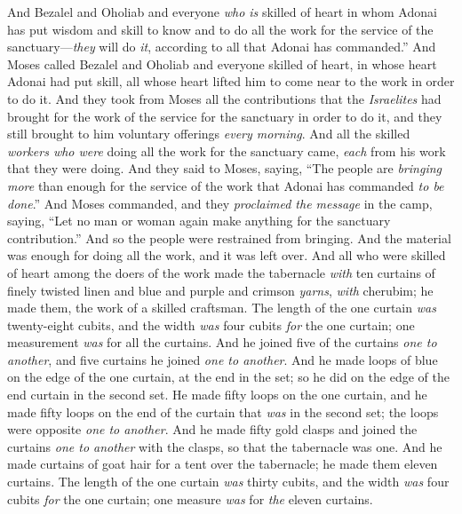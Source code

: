 \begin{biblechapter} %
\verse And Bezalel and Oholiab and everyone \textit{who is} skilled of heart in whom Adonai has put wisdom and skill to know and to do all the work for the service of the sanctuary—\textit{they} will do \textit{it}, according to all that Adonai has commanded.”
 And Moses called Bezalel and Oholiab and everyone skilled of heart, in whose heart Adonai had put skill, all whose heart lifted him to come near to the work in order to do it.
\verse And they took from Moses all the contributions that the \textit{Israelites} had brought for the work of the service for the sanctuary in order to do it, and they still brought to him voluntary offerings \textit{every morning}.
\verse And all the skilled \textit{workers who were} doing all the work for the sanctuary came, \textit{each} from his work that they were doing.
\verse And they said to Moses, saying, “The people are \textit{bringing more} than enough for the service of the work that Adonai has commanded \textit{to be done}.”
\verse And Moses commanded, and they \textit{proclaimed the message} in the camp, saying, “Let no man or woman again make anything for the sanctuary contribution.” And so the people were restrained from bringing.
\verse And the material was enough for doing all the work, and it was left over.
\verse And all who were skilled of heart among the doers of the work made the tabernacle \textit{with} ten curtains of finely twisted linen and blue and purple and crimson \textit{yarns}, \textit{with} cherubim; he made them, the work of a skilled craftsman.
\verse The length of the one curtain \textit{was} twenty-eight cubits, and the width \textit{was} four cubits \textit{for} the one curtain; one measurement \textit{was} for all the curtains.
\verse And he joined five of the curtains \textit{one to another}, and five curtains he joined \textit{one to another}.
\verse And he made loops of blue on the edge of the one curtain, at the end in the set; so he did on the edge of the end curtain in the second set.
\verse He made fifty loops on the one curtain, and he made fifty loops on the end of the curtain that \textit{was} in the second set; the loops were opposite \textit{one to another}.
\verse And he made fifty gold clasps and joined the curtains \textit{one to another} with the clasps, so that the tabernacle was one.
\verse And he made curtains of goat hair for a tent over the tabernacle; he made them eleven curtains.
\verse The length of the one curtain \textit{was} thirty cubits, and the width \textit{was} four cubits \textit{for} the one curtain; one measure \textit{was} for \textit{the} eleven curtains.

\end{biblechapter}
